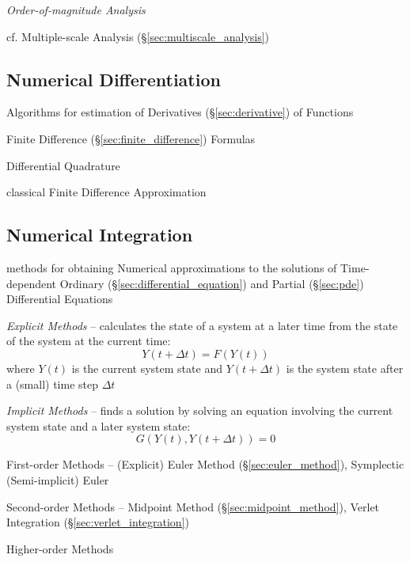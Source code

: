 \emph{Order-of-magnitude Analysis}

cf. Multiple-scale Analysis (\S\ref{sec:multiscale_analysis})



\subsection{Numerical Differentiation}\label{sec:numerical_differentiation}

Algorithms for estimation of Derivatives (\S\ref{sec:derivative}) of Functions

Finite Difference (\S\ref{sec:finite_difference}) Formulas

Differential Quadrature

classical Finite Difference Approximation



\subsection{Numerical Integration}\label{sec:numerical_integration}

methods for obtaining Numerical approximations to the solutions of
Time-dependent Ordinary (\S\ref{sec:differential_equation}) and Partial
(\S\ref{sec:pde}) Differential Equations

\emph{Explicit Methods} -- calculates the state of a system at a later time
from the state of the system at the current time:
\[
  Y(t+\Delta{t}) = F(Y(t))
\]
where $Y(t)$ is the current system state and $Y(t + \Delta{t})$ is the system
state after a (small) time step $\Delta{t}$

\emph{Implicit Methods} -- finds a solution by solving an equation involving
the current system state and a later system state:
\[
  G(Y(t), Y(t + \Delta{t})) = 0
\]

First-order Methods -- (Explicit) Euler Method (\S\ref{sec:euler_method}),
Symplectic (Semi-implicit) Euler

Second-order Methods -- Midpoint Method (\S\ref{sec:midpoint_method}), Verlet
Integration (\S\ref{sec:verlet_integration})

Higher-order Methods



